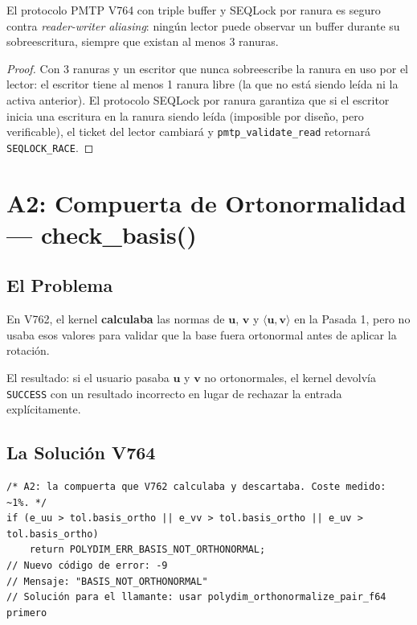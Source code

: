 \begin{theorem}
\label{thm:pmtp_triple}
El protocolo PMTP V764 con triple buffer y SEQLock por ranura es seguro contra
\textit{reader-writer aliasing}: ningún lector puede observar un buffer durante
su sobreescritura, siempre que existan al menos 3 ranuras.
\end{theorem}

\begin{proof}
Con 3 ranuras y un escritor que nunca sobreescribe la ranura en uso por el lector:
el escritor tiene al menos 1 ranura libre (la que no está siendo leída ni la activa anterior).
El protocolo SEQLock por ranura garantiza que si el escritor inicia una escritura
en la ranura siendo leída (imposible por diseño, pero verificable), el ticket
del lector cambiará y \texttt{pmtp\_validate\_read} retornará \texttt{SEQLOCK\_RACE}.
\end{proof}

\section{A2: Compuerta de Ortonormalidad --- check\_basis()}

\subsection{El Problema}

En V762, el kernel \textbf{calculaba} las normas de $\mathbf{u}$, $\mathbf{v}$ y
$\langle \mathbf{u}, \mathbf{v} \rangle$ en la Pasada 1, pero no usaba esos valores
para validar que la base fuera ortonormal antes de aplicar la rotación.

El resultado: si el usuario pasaba $\mathbf{u}$ y $\mathbf{v}$ no ortonormales,
el kernel devolvía \texttt{SUCCESS} con un resultado incorrecto en lugar de rechazar
la entrada explícitamente.

\subsection{La Solución V764}

\begin{lstlisting}[style=cppstyle, caption={Compuerta de ortonormalidad V764}, label=lst:check_basis]
/* A2: la compuerta que V762 calculaba y descartaba. Coste medido: ~1%. */
if (e_uu > tol.basis_ortho || e_vv > tol.basis_ortho || e_uv > tol.basis_ortho)
    return POLYDIM_ERR_BASIS_NOT_ORTHONORMAL;
// Nuevo código de error: -9
// Mensaje: "BASIS_NOT_ORTHONORMAL"
// Solución para el llamante: usar polydim_orthonormalize_pair_f64 primero
\end{lstlisting}

